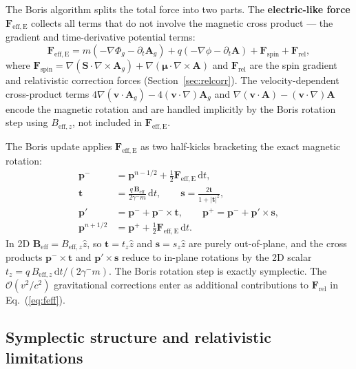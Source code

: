 \documentclass[11pt,a4paper]{article}
\newcommand{\vv}[1]{\mathbf{#1}}
\newcommand{\Phig}{\Phi_g}
\newcommand{\Ag}{\vv{A}_g}
\newcommand{\order}[1]{\mathcal{O}(#1)}
\newcommand{\dd}{\mathrm{d}}
\begin{document}
The Boris algorithm splits the total force into two parts.  The \textbf{electric-like force} $\vv{F}_{\mathrm{eff,E}}$ collects all terms that do not involve the magnetic cross product --- the gradient and time-derivative potential terms:
\begin{equation}
\label{eq:feff}
  \vv{F}_{\mathrm{eff,E}} = m(-\nabla\Phig - \partial_t\Ag)
                          + q(-\nabla\phi  - \partial_t\vv{A})
                          + \vv{F}_{\mathrm{spin}} + \vv{F}_{\mathrm{rel}},
\end{equation}
where $\vv{F}_{\mathrm{spin}} = \nabla(\vv{S}\cdot\nabla\times\Ag) + \nabla(\boldsymbol{\mu}\cdot\nabla\times\vv{A})$ and $\vv{F}_{\mathrm{rel}}$ are the spin gradient and relativistic correction forces (Section~\ref{sec:relcorr}).  The velocity-dependent cross-product terms $4\nabla(\vv{v}\cdot\Ag) - 4(\vv{v}\cdot\nabla)\Ag$ and $\nabla(\vv{v}\cdot\vv{A}) - (\vv{v}\cdot\nabla)\vv{A}$ encode the magnetic rotation and are handled implicitly by the Boris rotation step using $B_{\mathrm{eff},z}$, not included in $\vv{F}_{\mathrm{eff,E}}$.

The Boris update applies $\vv{F}_{\mathrm{eff,E}}$ as two half-kicks bracketing the exact magnetic rotation:
\begin{align}
  \vv{p}^- &= \vv{p}^{n-1/2} + \tfrac{1}{2}\vv{F}_{\mathrm{eff,E}}\,\dd t, \\
  \vv{t}   &= \frac{q\,\vv{B}_{\mathrm{eff}}}{2\gamma^- m}\,\dd t, \qquad
  \vv{s} = \frac{2\vv{t}}{1+|\vv{t}|^2}, \\
  \vv{p}'  &= \vv{p}^- + \vv{p}^-\times\vv{t}, \qquad
  \vv{p}^+ = \vv{p}^- + \vv{p}'\times\vv{s}, \\
  \vv{p}^{n+1/2} &= \vv{p}^+ + \tfrac{1}{2}\vv{F}_{\mathrm{eff,E}}\,\dd t.
\end{align}
In 2D $\vv{B}_{\mathrm{eff}} = B_{\mathrm{eff},z}\hat{z}$, so $\vv{t} = t_z\hat{z}$ and $\vv{s} = s_z\hat{z}$ are purely out-of-plane, and the cross products $\vv{p}^-\times\vv{t}$ and $\vv{p}'\times\vv{s}$ reduce to in-plane rotations by the 2D scalar $t_z = q\,B_{\mathrm{eff},z}\,\dd t/(2\gamma^- m)$.  The Boris rotation step is exactly symplectic.  The $\order{v^2/c^2}$ gravitational corrections enter as additional contributions to $\vv{F}_{\mathrm{rel}}$ in Eq.~(\ref{eq:feff}).

\subsection{Symplectic structure and relativistic limitations}
\end{document}
